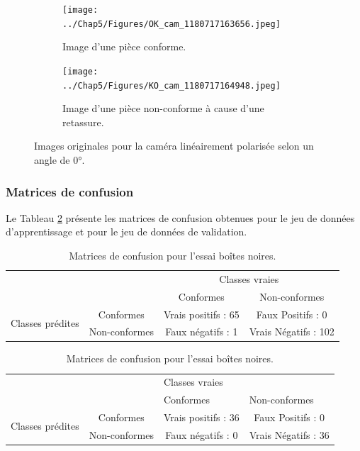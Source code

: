 \begin{figure}[hbtp]
	\centering
	\begin{subfigure}[c]{0.49\textwidth}
		\texttt{[image: ../Chap5/Figures/OK\_cam\_1180717163656.jpeg]}
		\caption{Image d'une pièce conforme.}
	\end{subfigure}
	\begin{subfigure}[c]{0.49\textwidth}
		\texttt{[image: ../Chap5/Figures/KO\_cam\_1180717164948.jpeg]}
		\caption{Image d'une pièce non-conforme à cause d'une retassure.}
	\end{subfigure}
	\caption{Images originales pour la caméra linéairement polarisée selon un angle de 0°.}
	\label{fig:IPC_ok_ko}
\end{figure}

\subsubsection{Matrices de confusion}
Le Tableau \ref{tab:box_results} présente les matrices de confusion obtenues pour le jeu de données d'apprentissage et pour le jeu de données de validation.
\begin{table}[!h]
	\centering
	\begin{subtable}{1\textwidth}
		\centering
		\begin{tabular}{c c|c|c|}
			\cline{3-4}
			& & \multicolumn{2}{c|}{Classes vraies}               \\ \cline{3-4}
			& & \multicolumn{1}{c|}{Conformes} & \multicolumn{1}{c|}{Non-conformes} \\ \hline
			\multicolumn{1}{|c|}{\multirow{2}{*}{Classes prédites}} & Conformes & Vrais positifs : 65 & Faux Positifs : 0 \\ \cline{2-4} 
			\multicolumn{1}{|c|}{} & Non-conformes & Faux négatifs : 1  & Vrais Négatifs : 102 \\ \hline
		\end{tabular}
		\caption{Jeu de données d'apprentissage.}
	\end{subtable}

	\bigskip

	\begin{subtable}{1\textwidth}
		\centering
		\begin{tabular}{l c|c|c|}
			\cline{3-4}
			& & \multicolumn{2}{l|}{Classes vraies}               \\ \cline{3-4}
			& & \multicolumn{1}{l|}{Conformes} & \multicolumn{1}{l|}{Non-conformes} \\ \hline
			\multicolumn{1}{|l|}{\multirow{2}{*}{Classes prédites}} & Conformes & Vrais positifs : 36 & Faux Positifs : 0 \\ \cline{2-4} 
			\multicolumn{1}{|l|}{} & Non-conformes & Faux négatifs : 0  & Vrais Négatifs : 36 \\ \hline
		\end{tabular}
		\caption{Jeu de données de validation.}
	\end{subtable}
	\caption{Matrices de confusion pour l'essai boîtes noires.}
	\label{tab:box_results}
\end{table}


